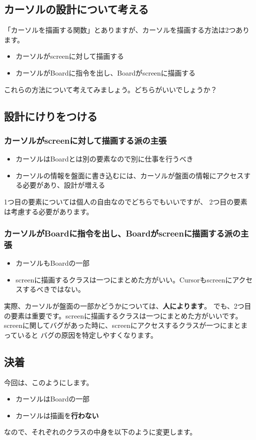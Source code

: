 \documentclass[12pt, a4paper, dvipdfmx]{book}
\begin{document}
\subsection{カーソルの設計について考える}
「カーソルを描画する関数」とありますが、カーソルを描画する方法は2つあります。
\begin{itemize}
  \item カーソルがscreenに対して描画する
  \item カーソルがBoardに指令を出し、Boardがscreenに描画する
\end{itemize}
これらの方法について考えてみましょう。どちらがいいでしょうか？
\newpage
\subsection{設計にけりをつける}
\subsubsection{カーソルがscreenに対して描画する派の主張}
\begin{itemize}
  \item カーソルはBoardとは別の要素なので別に仕事を行うべき
  \item カーソルの情報を盤面に書き込むには、カーソルが盤面の情報にアクセスする必要があり、設計が増える
\end{itemize}
1つ目の要素については個人の自由なのでどちらでもいいですが、
2つ目の要素は考慮する必要があります。

\subsubsection{カーソルがBoardに指令を出し、Boardがscreenに描画する派の主張}
\begin{itemize}
  \item カーソルもBoardの一部
  \item screenに描画するクラスは一つにまとめた方がいい。Cursorもscreenにアクセスするべきではない。
\end{itemize}
実際、カーソルが盤面の一部かどうかについては、\textbf{人によります}。
でも、2つ目の要素は重要です。screenに描画するクラスは一つにまとめた方がいいです。
screenに関してバグがあった時に、screenにアクセスするクラスが一つにまとまっていると
バグの原因を特定しやすくなります。

\subsection{決着}
今回は、このようにします。
\begin{itemize}
  \item カーソルはBoardの一部
  \item カーソルは描画を\textbf{行わない}
\end{itemize}
なので、それぞれのクラスの中身を以下のように変更します。
\end{document}
